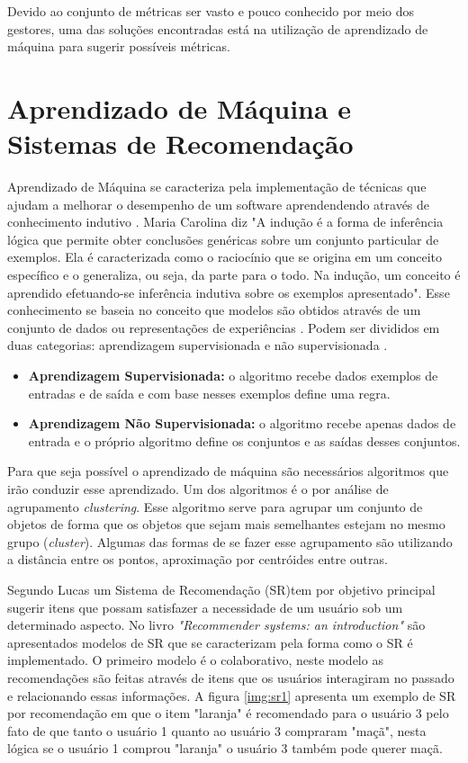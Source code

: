 Devido ao conjunto de métricas ser vasto e pouco conhecido por meio dos gestores, uma das soluções encontradas está na utilização de aprendizado de máquina para sugerir possíveis métricas.


\section{Aprendizado de Máquina e Sistemas de Recomendação}

Aprendizado de Máquina se caracteriza pela implementação de técnicas que ajudam a melhorar o desempenho de um software aprendendendo através de conhecimento indutivo \cite{mitchell1997mcgraw}. Maria Carolina \cite{monard2003conceitos} diz "A indução é a forma de inferência lógica que permite obter conclusões genéricas sobre um conjunto particular de exemplos. Ela é caracterizada como o raciocínio que se origina em um conceito específico e o generaliza, ou seja, da parte para o todo. Na indução, um conceito é aprendido efetuando-se inferência indutiva sobre os exemplos apresentado". Esse conhecimento se baseia no conceito que modelos são obtidos através de um conjunto de dados ou representações de experiências \cite{peres2012tutorial}. Podem ser divididos em duas categorias: aprendizagem supervisionada e não supervisionada \cite{russell2009artificial}.
\begin{itemize}
\item\textbf{Aprendizagem Supervisionada:} o algoritmo recebe dados exemplos de entradas e de saída e com base nesses exemplos define uma regra.
\item\textbf{Aprendizagem Não Supervisionada: } o algoritmo recebe apenas dados de entrada e o próprio algoritmo define os conjuntos e as saídas desses conjuntos.
\end{itemize}

Para que seja possível o aprendizado de máquina são necessários algoritmos que irão conduzir esse aprendizado. Um dos algoritmos é o por análise de agrupamento \textit{clustering}. Esse algoritmo serve para agrupar um conjunto de objetos de forma que os objetos que sejam mais semelhantes estejam no mesmo grupo (\textit{cluster}). Algumas das formas de se fazer esse agrupamento são utilizando a distância entre os pontos, aproximação por centróides entre outras.

Segundo Lucas \cite{brunialti2015aprendizado} um Sistema de Recomendação (SR)tem por objetivo principal sugerir itens que possam satisfazer a necessidade de um usuário sob um determinado aspecto. No livro \textit{"Recommender systems: an introduction"} \cite{jannach2010recommender} são apresentados modelos de SR que se caracterizam pela forma como o SR é implementado. O primeiro modelo é o colaborativo, neste modelo as recomendações são feitas através de itens que os usuários interagiram no passado e relacionando essas informações. A figura \ref{img:sr1} apresenta um exemplo de SR por recomendação em que o item "laranja" é recomendado para o usuário 3 pelo fato de que tanto o usuário 1 quanto ao usuário 3 compraram "maçã", nesta lógica se o usuário 1 comprou "laranja" o usuário 3 também pode querer maçã. 

